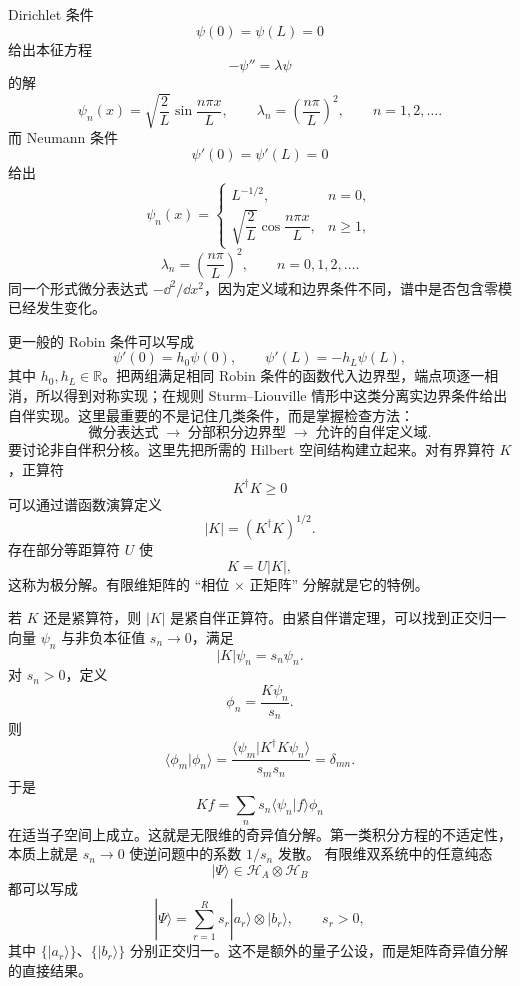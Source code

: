 Dirichlet 条件
\[
\psi(0)=\psi(L)=0
\]
给出本征方程
\[
-\psi''=\lambda\psi
\]
的解
\[
\psi_n(x)=\sqrt{\frac2L}\sin\frac{n\pi x}{L},
\qquad
\lambda_n=\left(\frac{n\pi}{L}\right)^2,
\qquad n=1,2,\ldots.
\]
而 Neumann 条件
\[
\psi'(0)=\psi'(L)=0
\]
给出
\[
\psi_n(x)=
\begin{cases}
L^{-1/2},&n=0,\\[3pt]
\sqrt{\dfrac2L}\cos\dfrac{n\pi x}{L},&n\ge1,
\end{cases}
\]
\[
\lambda_n=\left(\frac{n\pi}{L}\right)^2,
\qquad n=0,1,2,\ldots.
\]
同一个形式微分表达式 $-\dd^2/\dd x^2$，因为定义域和边界条件不同，谱中是否包含零模已经发生变化。

更一般的 Robin 条件可以写成
\[
\psi'(0)=h_0\psi(0),
\qquad
\psi'(L)=-h_L\psi(L),
\]
其中 $h_0,h_L\in\mathbb R$。把两组满足相同 Robin 条件的函数代入边界型，端点项逐一相消，所以得到对称实现；在规则 Sturm--Liouville 情形中这类分离实边界条件给出自伴实现。这里最重要的不是记住几类条件，而是掌握检查方法：
\[
\boxed{
\text{微分表达式}
\;\longrightarrow\;
\text{分部积分边界型}
\;\longrightarrow\;
\text{允许的自伴定义域}
}.
\]
要讨论非自伴积分核。这里先把所需的 Hilbert 空间结构建立起来。对有界算符 $K$，正算符
\[
K^\dagger K\ge0
\]
可以通过谱函数演算定义
\[
|K|=(K^\dagger K)^{1/2}.
\]
存在部分等距算符 $U$ 使
\begin{equation*}\boxed{K=U|K|},\end{equation*}
这称为极分解。有限维矩阵的 ``相位 $\times$ 正矩阵'' 分解就是它的特例。

若 $K$ 还是紧算符，则 $|K|$ 是紧自伴正算符。由紧自伴谱定理，可以找到正交归一向量 $\psi_n$ 与非负本征值 $s_n\to0$，满足
\[
|K|\psi_n=s_n\psi_n.
\]
对 $s_n>0$，定义
\[
\phi_n=\frac{K\psi_n}{s_n}.
\]
则
\[
\langle\phi_m|\phi_n\rangle
=\frac{\langle\psi_m|K^\dagger K\psi_n\rangle}{s_ms_n}
=\delta_{mn}.
\]
于是
\begin{equation*}\boxed{
Kf=\sum_{n}s_n\langle\psi_n|f\rangle\phi_n
}\end{equation*}
在适当子空间上成立。这就是无限维的奇异值分解。第一类积分方程的不适定性，本质上就是 $s_n\to0$ 使逆问题中的系数 $1/s_n$ 发散。
有限维双系统中的任意纯态
\[
|\Psi\rangle\in\mathcal H_A\otimes\mathcal H_B
\]
都可以写成
\begin{equation}
\boxed{
|\Psi\rangle
=\sum_{r=1}^{R}s_r|a_r\rangle\otimes|b_r\rangle,
\qquad s_r>0,
}
\label{eq:schmidt-decomposition}
\end{equation}
其中 $\{|a_r\rangle\}$、$\{|b_r\rangle\}$ 分别正交归一。这不是额外的量子公设，而是矩阵奇异值分解的直接结果。

